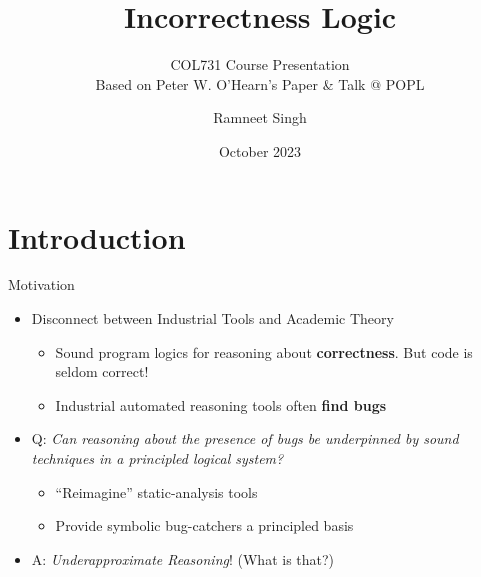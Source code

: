 \documentclass[
  10pt,
  ignorenonframetext,
]{beamer}
\title{Incorrectness Logic}
\subtitle{COL731 Course Presentation\\
Based on Peter W. O'Hearn's Paper \& Talk @ POPL \textquotesingle20}
\author{Ramneet Singh}
\date{October 2023}
\institute{IIT Delhi}
\providecommand{\tightlist}{%
  \setlength{\itemsep}{0pt}\setlength{\parskip}{0pt}}
\begin{document}
\frame{\titlepage}

\begin{frame}[allowframebreaks]
  \tableofcontents[hideallsubsections]
\end{frame}
\section{Introduction}\label{introduction}

\begin{frame}{Motivation}
\label{motivation}
\begin{itemize}
\tightlist
\item
  Disconnect between Industrial Tools and Academic Theory

  \begin{itemize}
  \tightlist
  \item
    Sound program logics for reasoning about \textbf{correctness}. But
    code is seldom correct!
  \item
    Industrial automated reasoning tools often \textbf{find bugs}
  \end{itemize}
\item
  Q: \emph{Can reasoning about the presence of bugs be underpinned by
  sound techniques in a principled logical system?}

  \begin{itemize}
  \tightlist
  \item
    ``Reimagine'' static-analysis tools
  \item
    Provide symbolic bug-catchers a principled basis
  \end{itemize}
\item
  A: \emph{Underapproximate Reasoning}! (What is that?)
\end{itemize}
\end{frame}
\end{document}
